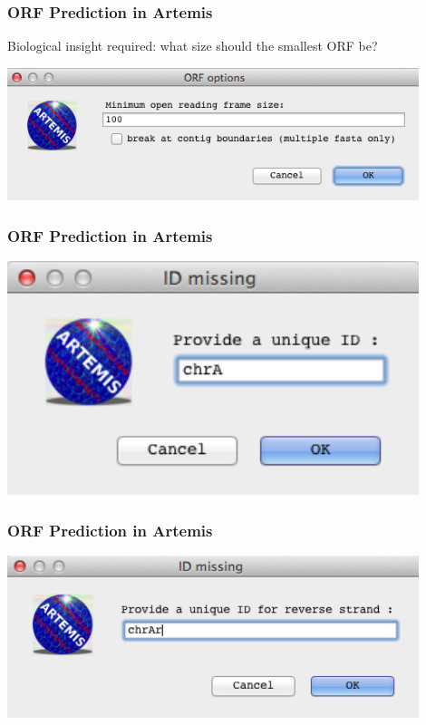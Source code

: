 \documentclass[table]{beamer}
\begin{document}
    \begin{frame}
      \frametitle{ORF Prediction in Artemis}
      Biological insight required: what size should the smallest ORF be?
      \begin{center}
        \includegraphics[width=0.9\textwidth]{images/artemis_orf1}     
      \end{center}
    \end{frame}

    \begin{frame}
      \frametitle{ORF Prediction in Artemis}    
      \begin{center}
        \includegraphics[width=0.9\textwidth]{images/artemis_orf2}     
      \end{center}
    \end{frame}

    \begin{frame}
      \frametitle{ORF Prediction in Artemis}    
      \begin{center}
        \includegraphics[width=0.9\textwidth]{images/artemis_orf3}     
      \end{center}
    \end{frame}
\end{document}

